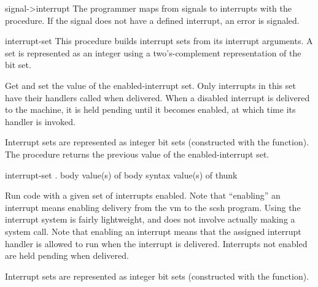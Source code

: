\begin{defundesc}{signal->interrupt}{\integer}{\integer}
The programmer maps from {\Unix} signals to {\scm} interrupts with the
 procedure.
If the signal does not have a defined {\scm} interrupt, an error is signaled.
\end{defundesc}


\begin{defundesc}{interrupt-set}{\zeroormore{\integer}}{\integer}
This procedure builds interrupt sets from its interrupt arguments.
A set is represented as an integer using a two's-complement representation of
the bit set.
\end{defundesc}


\begin{desc}
Get and set the value of the enabled-interrupt set.
Only interrupts in this set have their handlers called when delivered.
When a disabled interrupt is delivered to the {\scm} machine, it is
held pending until it becomes enabled, at which time its handler is invoked.

Interrupt sets are represented as integer bit sets (constructed with
the  function).
The  procedure returns the previous value of
the enabled-interrupt set.
\end{desc}

 {interrupt-set . body} {value(s) of body} {syntax}
 {value(s) of thunk}
\begin{desc}
Run code with a given set of interrupts enabled.
Note that ``enabling'' an interrupt means enabling delivery from
the {\scm} vm to the scsh program.
Using the {\scm} interrupt system is fairly lightweight, and does not involve
actually making a system call.
Note that enabling an interrupt means that the assigned interrupt handler
is allowed to run when the interrupt is delivered.
Interrupts not enabled are held pending when delivered.

Interrupt sets are represented as integer bit sets (constructed with
the  function).
\end{desc}



